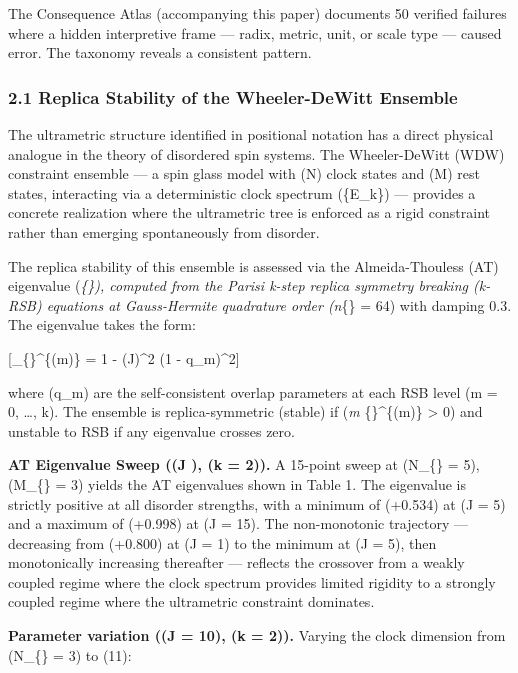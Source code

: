 \documentclass[
]{article}
\begin{document}
The Consequence Atlas (accompanying this paper) documents 50 verified
failures where a hidden interpretive frame --- radix, metric, unit, or
scale type --- caused error. The taxonomy reveals a consistent pattern.

\subsubsection{2.1 Replica Stability of the Wheeler-DeWitt
Ensemble}\label{replica-stability-of-the-wheeler-dewitt-ensemble}

The ultrametric structure identified in positional notation has a direct
physical analogue in the theory of disordered spin systems. The
Wheeler-DeWitt (WDW) constraint ensemble --- a spin glass model with (N)
clock states and (M) rest states, interacting via a deterministic clock
spectrum (\{E\_k\}) --- provides a concrete realization where the
ultrametric tree is enforced as a rigid constraint rather than emerging
spontaneously from disorder.

The replica stability of this ensemble is assessed via the
Almeida-Thouless (AT) eigenvalue (\lambda\emph{\{\}), computed
from the Parisi k-step replica symmetry breaking (k-RSB) equations at
Gauss-Hermite quadrature order (n}\{\} = 64) with damping 0.3.
The eigenvalue takes the form:

{[}\lambda\_\{\}\^{}\{(m)\} = 1 - (\beta J)\^{}2 (1 -
q\_m)\^{}2{]}

where (q\_m) are the self-consistent overlap parameters at each RSB
level (m = 0, \ldots, k). The ensemble is replica-symmetric (stable) if
(\min\emph{m \lambda}\{\}\^{}\{(m)\} \textgreater{} 0) and
unstable to RSB if any eigenvalue crosses zero.

\textbf{AT Eigenvalue Sweep ((\beta J \in [1, 15]), (k = 2)).} A
15-point sweep at (N\_\{\} = 5), (M\_\{\} = 3)
yields the AT eigenvalues shown in Table 1. The eigenvalue is strictly
positive at all disorder strengths, with a minimum of (+0.534) at
(\beta J = 5) and a maximum of (+0.998) at (\beta J = 15). The
non-monotonic trajectory --- decreasing from (+0.800) at (\beta J = 1)
to the minimum at (\beta J = 5), then monotonically increasing
thereafter --- reflects the crossover from a weakly coupled regime where
the clock spectrum provides limited rigidity to a strongly coupled
regime where the ultrametric constraint dominates.

\textbf{Parameter variation ((\beta J = 10), (k = 2)).} Varying the
clock dimension from (N\_\{\} = 3) to (11):
\end{document}
